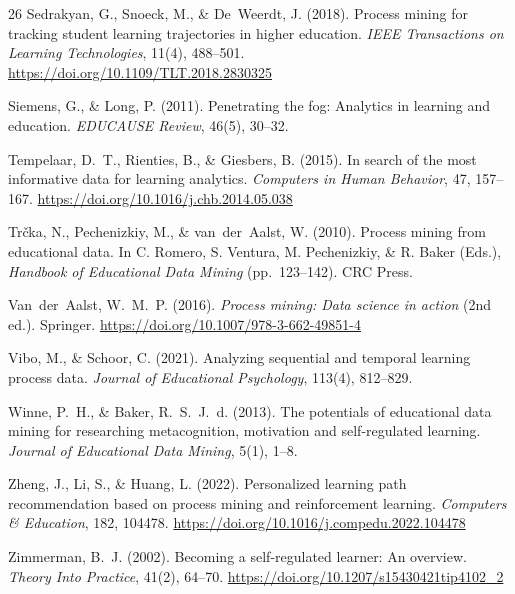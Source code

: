 \begin{thebibliography}{26}
Sedrakyan, G., Snoeck, M., \& De~Weerdt, J. (2018). Process mining for tracking student learning trajectories in higher education. \textit{IEEE Transactions on Learning Technologies}, 11(4), 488--501. \url{https://doi.org/10.1109/TLT.2018.2830325}

Siemens, G., \& Long, P. (2011). Penetrating the fog: Analytics in learning and education. \textit{EDUCAUSE Review}, 46(5), 30--32.

Tempelaar, D.~T., Rienties, B., \& Giesbers, B. (2015). In search of the most informative data for learning analytics. \textit{Computers in Human Behavior}, 47, 157--167. \url{https://doi.org/10.1016/j.chb.2014.05.038}

Tr{\v{c}}ka, N., Pechenizkiy, M., \& van~der~Aalst, W. (2010). Process mining from educational data. In C. Romero, S. Ventura, M. Pechenizkiy, \& R. Baker (Eds.), \textit{Handbook of Educational Data Mining} (pp.~123--142). CRC Press.

Van~der~Aalst, W.~M.~P. (2016). \textit{Process mining: Data science in action} (2nd ed.). Springer. \url{https://doi.org/10.1007/978-3-662-49851-4}

Vibo, M., \& Schoor, C. (2021). Analyzing sequential and temporal learning process data. \textit{Journal of Educational Psychology}, 113(4), 812--829.

Winne, P.~H., \& Baker, R.~S.~J.~d. (2013). The potentials of educational data mining for researching metacognition, motivation and self-regulated learning. \textit{Journal of Educational Data Mining}, 5(1), 1--8.

Zheng, J., Li, S., \& Huang, L. (2022). Personalized learning path recommendation based on process mining and reinforcement learning. \textit{Computers \& Education}, 182, 104478. \url{https://doi.org/10.1016/j.compedu.2022.104478}

Zimmerman, B.~J. (2002). Becoming a self-regulated learner: An overview. \textit{Theory Into Practice}, 41(2), 64--70. \url{https://doi.org/10.1207/s15430421tip4102_2}

\end{thebibliography}
